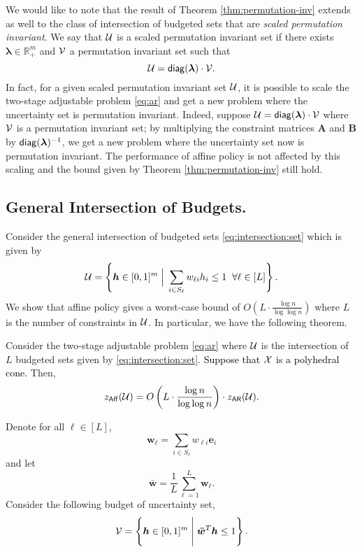 \documentclass[moor]{informs1}              %
\newcommand{\mb}[1]{\ensuremath{\boldsymbol{#1}}}
\newcommand*{\red}{\textcolor{black}}
\begin{document}
We would like to note that the result of Theorem \ref{thm:permutation-inv} extends as well to the class of  intersection of budgeted  sets that are {\em scaled permutation invariant}. We say that ${\cal U} $ is a scaled permutation invariant set if there exists $\mb \lambda \in \mathbb{R}^m_+$ and $ {\cal V}$ a permutation invariant set such that 
$$ {\cal U}= {\sf diag} (\mb \lambda) \cdot {\cal V}.$$ 
In fact, for a given scaled permutation invariant set ${\cal U}$, it is possible to scale the two-stage adjustable problem \eqref{eq:ar} and get a new problem where the uncertainty set is permutation invariant. Indeed, suppose $ {\cal U}= {\sf diag} (\mb \lambda) \cdot {\cal V}$ where $ {\cal V}$ is a permutation invariant set; by multiplying the constraint matrices $\mb A$ and $ \mb B$ by ${\sf diag} (\mb \lambda)^{-1}$, we get a new problem where the uncertainty set now is permutation invariant. The performance of affine policy is not affected by this scaling and the bound given by Theorem \ref{thm:permutation-inv} still hold.








\subsection{General Intersection of Budgets.}
Consider the general intersection of budgeted  sets  \eqref{eq:intersection:set} which is given by
$${\cal U} = \left\{ \mb h \in [0,1]^m  \; \Big\vert \; \sum_{i \in S_{\ell}}  w_{\ell i}  h_i \leq 1 \;\;  \forall \ell \in [L] \right\}.$$
We show that affine policy gives a worst-case bound of $O \left( L \cdot  \frac{\log n}{\log \log n} \right) $ where $L$ is the number of constraints in  $\cal U$. In particular, we have the following theorem.
\begin{theorem}\label{thm:general-intersection}
Consider the two-stage adjustable problem \eqref{eq:ar} where $ {\cal U}$ is the  intersection of $L$ budgeted  sets given by \eqref{eq:intersection:set}. \red{ Suppose that $\cal X$ is a polyhedral cone.} Then,
$$ z_{\sf Aff}({\cal U}) = O \left( L \cdot  \frac{\log n}{\log \log n} \right)    \cdot z_{\sf AR}({\cal U}) .$$
\end{theorem}

Denote for all $\ell \in [L]$,
$$\mb w_{\ell} = \sum_{i \in S_{\ell}} w_{\ell i} \mb e_i$$
and let
$$  \mb{\bar w} =  \frac{1}{L}\sum_{\ell=1}^L \mb w_{\ell} .$$
Consider the following budget of uncertainty set,
$${\cal V} = \left\{ \mb h \in [0,1]^m  \; \Bigg\vert \;  \mb{\bar w}^T \mb h \leq 1 \right\}.$$
\end{document}
